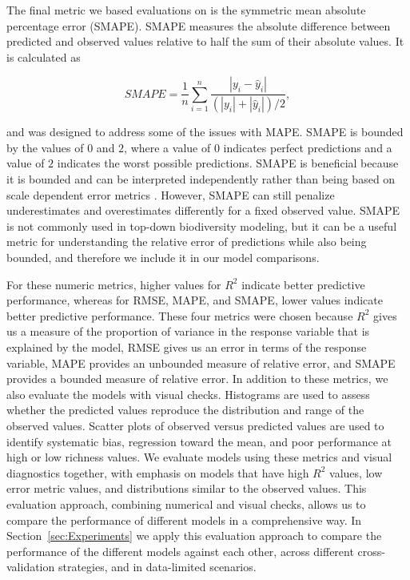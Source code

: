 The final metric we based evaluations on is the symmetric mean absolute percentage error (SMAPE). SMAPE measures the absolute difference between predicted and observed values relative to half the sum of their absolute values. It is calculated as

\[SMAPE = \frac{1}{n}\sum_{i=1}^n \frac{\left|y_i - \hat{y}_i\right|}{(\left|y_i\right| + \left|\hat{y}_i\right|)/2},\]

and was designed to address some of the issues with MAPE.
SMAPE is bounded by the values of \(0\) and \(2\), where a value of \(0\) indicates perfect predictions and a value of \(2\) indicates the worst possible predictions. SMAPE is beneficial because it is bounded and can be interpreted independently rather than being based on scale dependent error metrics \parencite{chicco2021}. However, SMAPE can still penalize underestimates and overestimates differently for a fixed observed value. SMAPE is not commonly used in top-down biodiversity modeling, but it can be a useful metric for understanding the relative error of predictions while also being bounded, and therefore we include it in our model comparisons.

For these numeric metrics, higher values for \(R^2\) indicate better predictive performance, whereas for RMSE, MAPE, and SMAPE, lower values indicate better predictive performance. These four metrics were chosen because \(R^2\) gives us a measure of the proportion of variance in the response variable that is explained by the model, RMSE gives us an error in terms of the response variable, MAPE provides an unbounded measure of relative error, and SMAPE provides a bounded measure of relative error. In addition to these metrics, we also evaluate the models with visual checks. Histograms are used to assess whether the predicted values reproduce the distribution and range of the observed values. Scatter plots of observed versus predicted values are used to identify systematic bias, regression toward the mean, and poor performance at high or low richness values. We evaluate models using these metrics and visual diagnostics together, with emphasis on models that have high \(R^2\) values, low error metric values, and distributions similar to the observed values. This evaluation approach, combining numerical and visual checks, allows us to compare the performance of different models in a comprehensive way. In Section~\ref{sec:Experiments} we apply this evaluation approach to compare the performance of the different models against each other, across different cross-validation strategies, and in data-limited scenarios.
